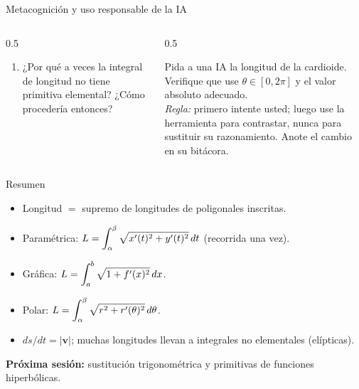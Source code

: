 \documentclass[10pt,aspectratio=169]{beamer}
\begin{document}
\begin{frame}{Metacognición y uso responsable de la IA}
  \small
  \begin{columns}[t]
    \begin{column}{0.5\textwidth}
      \begin{metacog}
        \begin{enumerate}
          \metacomun
          \item ¿Por qué a veces la integral de longitud no tiene primitiva elemental? ¿Cómo procedería entonces?
        \end{enumerate}
      \end{metacog}
    \end{column}
    \begin{column}{0.5\textwidth}
      \begin{iabox}
        Pida a una IA la longitud de la cardioide. Verifique que use $\theta\in[0,2\pi]$ y el valor absoluto adecuado.\\[2pt]
        \textit{Regla:} primero intente usted; luego use la herramienta para contrastar, nunca para sustituir su razonamiento. Anote el cambio en su bitácora.
      \end{iabox}
    \end{column}
  \end{columns}
\end{frame}

\begin{frame}{Resumen}
  \begin{itemize}
    \item Longitud $=$ supremo de longitudes de poligonales inscritas.
    \item Paramétrica: $L=\displaystyle\int_\alpha^\beta\sqrt{x'(t)^2+y'(t)^2}\,dt$ (recorrida una vez).
    \item Gráfica: $L=\displaystyle\int_a^b\sqrt{1+f'(x)^2}\,dx$.
    \item Polar: $L=\displaystyle\int_\alpha^\beta\sqrt{r^2+r'(\theta)^2}\,d\theta$.
    \item $ds/dt=|\mathbf v|$; muchas longitudes llevan a integrales no elementales (elípticas).
  \end{itemize}
  \vspace{3mm}
  \textbf{Próxima sesión:} sustitución trigonométrica y primitivas de funciones hiperbólicas.
\end{frame}
\end{document}
